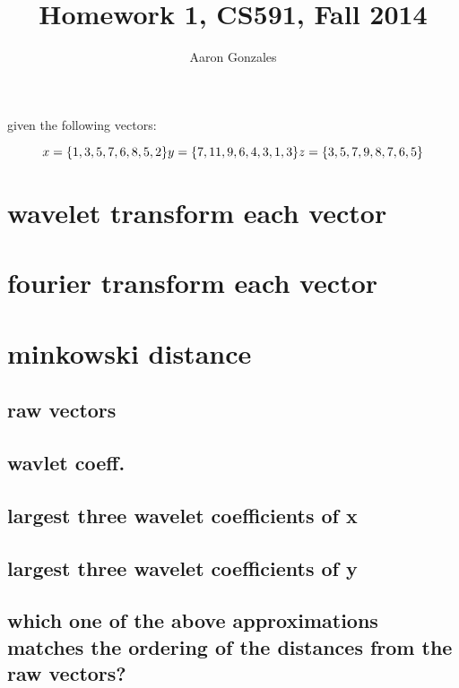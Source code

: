 \documentclass{article}
\begin{document}
\title{Homework 1, CS591, Fall 2014}
\author{Aaron Gonzales}
\maketitle


given the following vectors:

\begin{equation}
x = \{1, 3, 5, 7, 6, 8, 5, 2\}  \\
y = \{7, 11, 9, 6, 4, 3, 1, 3\}  \\
z = \{3, 5, 7, 9, 8, 7, 6, 5\}  \\
\end{equation}

\section{wavelet transform each vector}



\section{fourier transform each vector}

\section{minkowski distance}

\subsection{raw vectors}


\subsection{wavlet coeff.}


\subsection{largest three wavelet coefficients of x}


\subsection{largest three wavelet coefficients of y}


\subsection{which one of the above approximations matches the ordering of the distances from 
the raw vectors?}
\end{document}
